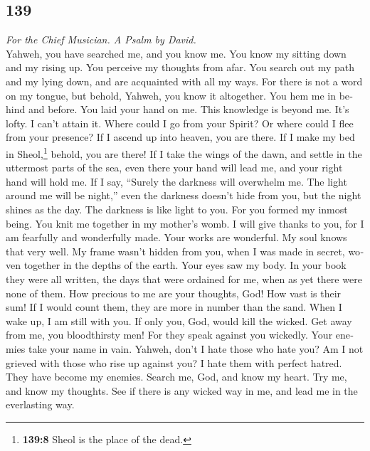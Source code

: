 \begin{paracol}{2}
\switchcolumn
\begin{otherlanguage}{english}

\hypertarget{section-277}{%
\section{139}\label{section-277}}

\emph{For the Chief Musician. A Psalm by David.}\\
 Yahweh, you have searched me, and you know me.
 You know my sitting down and my rising up. You perceive
my thoughts from afar.  You search out my path and my
lying down, and are acquainted with all my ways.  For
there is not a word on my tongue, but behold, Yahweh, you know it
altogether.  You hem me in behind and before. You laid
your hand on me.  This knowledge is beyond me. It's lofty.
I can't attain it.  Where could I go from your Spirit? Or
where could I flee from your presence?  If I ascend up
into heaven, you are there. If I make my bed in Sheol,\footnote{\textbf{139:8}
  Sheol is the place of the dead.} behold, you are there! 
If I take the wings of the dawn, and settle in the uttermost parts of
the sea,  even there your hand will lead me, and your
right hand will hold me.  If I say, ``Surely the darkness
will overwhelm me. The light around me will be night,'' 
even the darkness doesn't hide from you, but the night shines as the
day. The darkness is like light to you.  For you formed
my inmost being. You knit me together in my mother's womb.
 I will give thanks to you, for I am fearfully and
wonderfully made. Your works are wonderful. My soul knows that very
well.  My frame wasn't hidden from you, when I was made
in secret, woven together in the depths of the earth. 
Your eyes saw my body. In your book they were all written, the days that
were ordained for me, when as yet there were none of them.
 How precious to me are your thoughts, God! How vast is
their sum!  If I would count them, they are more in
number than the sand. When I wake up, I am still with you.
 If only you, God, would kill the wicked. Get away from
me, you bloodthirsty men!  For they speak against you
wickedly. Your enemies take your name in vain.  Yahweh,
don't I hate those who hate you? Am I not grieved with those who rise up
against you?  I hate them with perfect hatred. They have
become my enemies.  Search me, God, and know my heart.
Try me, and know my thoughts.  See if there is any wicked
way in me, and lead me in the everlasting way.


\end{otherlanguage}
\end{paracol}
